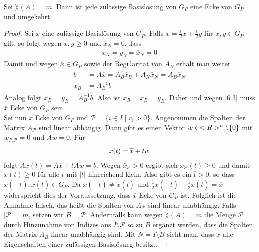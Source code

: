 \begin{proposition}
	Sei $\rang(A)=m$. Dann ist jede zulässige Basislösung von $G_P$ eine Ecke von $G_P$ und umgekehrt.
\end{proposition}
\begin{proof}
	Sei $\overline{x}$ eine zulässige Basislösung von $G_P$. Falls $\overline{x}=\frac{1}{2}x+\frac{1}{2}y$ für $x,y\in G_P$ gilt, so folgt wegen $x,y\ge 0$ und $\overline{x}_N=0$, dass
	\begin{align}
		\label{6.3}
		x_N=y_N=\overline{x}_N=0
	\end{align}
	Damit und wegen $\overline{x}\in G_P$ sowie der Regularität von $A_B$ erhält man weiter
	\begin{align}
		\label{6.4}
		\begin{split}
			b &= A\overline{x} = A_B\overline{x}_B + A_N\overline{x}_N = A_B\overline{x}_N \\
			\overline{x}_B &= A^{-1}_Bb
		\end{split}
	\end{align}
	Analog folgt $x_B=y_B=A^{-1}_Bb$. Also ist $\overline{x}_B=x_B=y_B$. Daher und wegen \cref{6.3} muss $\overline{x}$ Ecke von $G_P$ sein. \\
	Sei nun $\overline{x}$ Ecke von $G_P$ und $\mathcal{P}=\{i\in I\mid \overline{x}_i>0\}$. Angenommen die Spalten der Matrix $A_\mathcal{P}$ sind linear abhängig. Dann gibt es einen Vektor $w\in<R>^n\backslash\{0\}$ mit $w_{I\setminus\mathcal{P}}=0$ und $Aw=0$. Für
	\begin{align}
		x(t) = \overline{x} + tw\notag
	\end{align}
	folgt $Ax(t)=A\overline{x} + tAw=b$. Wegen $\overline{x}_\mathcal{P}>0$ ergibt sich $x_\mathcal{P}(t)\ge 0$ und damit $x(t)\ge 0$ für alle $t$ mit $\vert t\vert$ hinreichend klein. Also gibt es ein $\overline{t}>0$, so dass $x(-\overline{t}),x(\overline{t})\in G_P$. Da $x(-\overline{t})\neq x(\overline{t})$ und $\frac{1}{2}x(-\overline{t}) + \frac{1}{2}x(\overline{t})=\overline{x}$ widerspricht dies der Voraussetzung, dass $\overline{x}$ Ecke von $G_P$ ist. Folglich ist die Annahme falsch, das heißt die Spalten von $A_\mathcal{P}$ sind linear unabhängig. Falls $\vert \mathcal{P}\vert=m$, setzen wir $B=\mathcal{P}$. Andernfalls kann wegen $\rang(A)=m$ die Menge $\mathcal{P}$ durch Hinzunahme von Indizes aus $I\setminus \mathcal{P}$ so zu $B$ ergänzt werden, dass die Spalten der Matrix $A_B$ linear unabhängig sind. Mit $N=I\setminus B$ sieht man, dass $\overline{x}$ alle Eigenschaften einer zulässigen Basislösung besitzt.
\end{proof}

